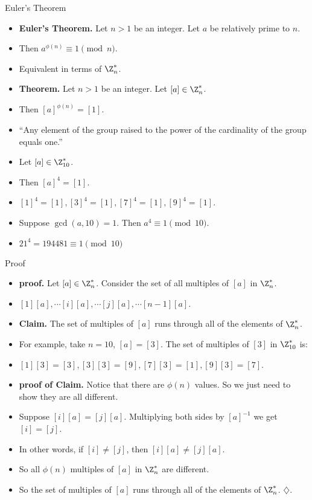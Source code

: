 \documentclass{beamer}
\begin{document}
\begin{frame}{Euler's Theorem}

\begin{itemize}
  \item \textbf{Euler's Theorem.} Let $n>1$ be an integer. Let $a$ be relatively prime to $n$.
  \item Then $a^{\phi(n)} \equiv 1 \pmod n$.
  \item Equivalent in terms of $\Z_n^*$.
  \item \textbf{Theorem.} Let $n>1$ be an integer. Let $[a]\in\Z_n^*$.
  \item Then $[a]^{\phi(n)} = [1]$.
  \item ``Any element of the group raised to the power of the cardinality of the group equals one.''
  \item Let $[a]\in\Z_{10}^*$.
  \item Then $[a]^4 = [1]$.
  \item $[1]^4=[1], [3]^4=[1], [7]^4 = [1], [9]^4 = [1]$.
  \item Suppose $\gcd(a,10)=1$. Then $a^4 \equiv 1 \pmod{10}$.
  \item $21^4=194481 \equiv 1 \pmod {10}$
\end{itemize}

\end{frame}

\begin{frame}{Proof}

\begin{itemize}
  \item \textbf{proof.} Let $[a] \in \Z_n^*$. Consider the set of all multiples of $[a]$ in $\Z_n^*$.
  \item $[1][a], \cdots [i][a], \cdots [j][a], \cdots [n-1][a]$.
  \item \textbf{Claim.} The set of multiples of $[a]$ runs through all of the elements of $\Z_n^*$.
  \item For example, take $n=10$, $[a]=[3]$. The set of multiples of $[3]$ in $\Z_{10}^*$ is:
  \item $[1][3]=[3], [3][3]=[9], [7][3]=[1], [9][3] = [7]$.
  \item \textbf{proof of Claim.} Notice that there are $\phi(n)$ values. So we just need to show they are all different.
  \item Suppose $[i][a]=[j][a]$. Multiplying both sides by $[a]^{-1}$ we get $[i]=[j]$.
  \item In other words, if $[i]\not=[j]$, then $[i][a]\not=[j][a]$.
  \item So all $\phi(n)$ multiples of $[a]$ in $\Z_n^*$ are different.
  \item So the set of multiples of $[a]$ runs through all of the elements of $\Z_n^*$. $\diamondsuit$.
\end{itemize}

\end{frame}
\end{document}
